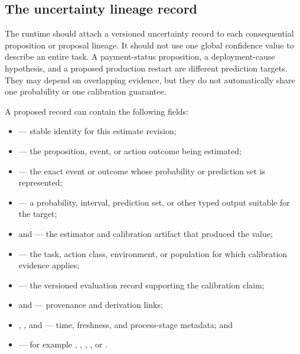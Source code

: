 
\subsection{The uncertainty lineage record}
\label{sec:ch16-uncertainty-record}

\EngineeringLabel{} The runtime should attach a versioned uncertainty record to each consequential proposition or proposal lineage. It should not use one global confidence value to describe an entire task. A payment-status proposition, a deployment-cause hypothesis, and a proposed production restart are different prediction targets. They may depend on overlapping evidence, but they do not automatically share one probability or one calibration guarantee.

A proposed record can contain the following fields:

\begin{itemize}
  \item \texttt{} — stable identity for this estimate revision;
  \item \texttt{} — the proposition, event, or action outcome being estimated;
  \item \texttt{} — the exact event or outcome whose probability or prediction set is represented;
  \item \texttt{} — a probability, interval, prediction set, or other typed output suitable for the target;
  \item \texttt{} and \texttt{} — the estimator and calibration artifact that produced the value;
  \item \texttt{} — the task, action class, environment, or population for which calibration evidence applies;
  \item \texttt{} — the versioned evaluation record supporting the calibration claim;
  \item \texttt{} and \texttt{} — provenance and derivation links;
  \item \texttt{}, \texttt{}, and \texttt{} — time, freshness, and process-stage metadata; and
  \item \texttt{} — for example \texttt{}, \texttt{}, \texttt{}, \texttt{}, or \texttt{}.
\end{itemize}

